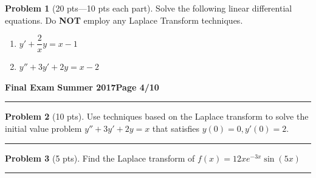 \documentclass[12pt]{article}
\theoremstyle{definition}
\newtheorem{problem}{Problem}
\begin{document}
\bigskip
\begin{problem}[20 pts---10 pts each part]
Solve the following linear differential equations.  \newline Do \textbf{NOT} employ any Laplace Transform techniques.
\begin{enumerate}
  \item $y'+ \dfrac{2}{x} y = x-1$
  \vspace{7cm}
  \begin{flushright}
  \end{flushright}
  \item $y''+3y'+2y=x-2$
  \vspace{9.5cm}
  \begin{flushright}
  \end{flushright}
\end{enumerate}
\end{problem} 

\newpage

\hfill{\large\bf Final Exam}\hfill{\large\bf
Summer 2017}\hfill{\large\bf Page 4/10}\hrule

\bigskip
\begin{problem}[10 pts]
Use techniques based on the Laplace transform to solve the initial value problem $y''+3y'+2y=x$ that satisfies $y(0)=0, y'(0)=2$.
\vspace{8cm}
\begin{flushright}
\end{flushright}
\end{problem}
\hrule

\begin{problem}[5 pts]
Find the Laplace transform of $f(x) = 12x e^{-3x} \sin(5x)$
\vspace{5cm}

\begin{flushright}
\end{flushright}
\end{problem}
\hrule
\end{document}
